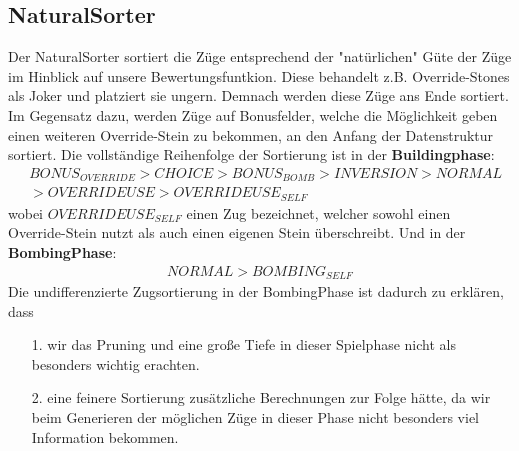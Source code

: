 \subsection*{NaturalSorter}
Der NaturalSorter sortiert die Züge entsprechend der "natürlichen" Güte der Züge im Hinblick auf unsere Bewertungsfuntkion. Diese behandelt z.B. Override-Stones als Joker und platziert sie ungern. Demnach werden diese Züge ans Ende sortiert. Im Gegensatz dazu, werden Züge auf Bonusfelder, welche die Möglichkeit geben einen weiteren Override-Stein zu bekommen, an den Anfang der Datenstruktur sortiert. Die vollständige Reihenfolge der Sortierung ist in der \textbf{Buildingphase}:
\begin{align*}
&BONUS_{OVERRIDE} > CHOICE > BONUS_{BOMB} > INVERSION >  NORMAL \\ &> OVERRIDEUSE > OVERRIDEUSE_{SELF}
\end{align*}
wobei $OVERRIDEUSE_{SELF}$ einen Zug bezeichnet, welcher sowohl einen Override-Stein nutzt als auch einen eigenen Stein überschreibt. Und in der \textbf{BombingPhase}:
\begin{align*}
NORMAL > BOMBING_{SELF}
\end{align*}
Die undifferenzierte Zugsortierung in der BombingPhase ist dadurch zu erklären, dass
\begin{enumerate}
\item[1.] wir das Pruning und eine große Tiefe in dieser Spielphase nicht als besonders wichtig erachten.
\item[2.] eine feinere Sortierung zusätzliche Berechnungen zur Folge hätte, da wir beim Generieren der möglichen Züge in dieser Phase nicht besonders viel Information bekommen.
\end{enumerate}


